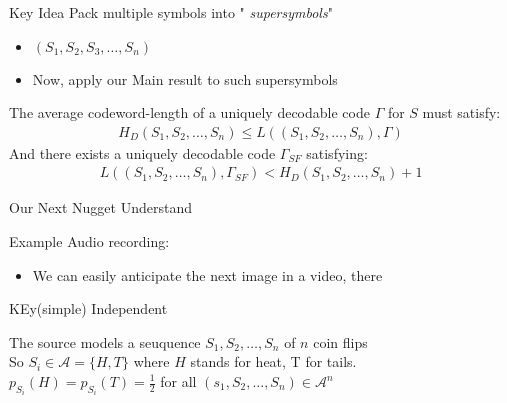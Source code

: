 

\begin{parag}{Key Idea}
    Pack multiple symbols into " \textit{supersymbols}"
    \begin{itemize}
        \item $(S_1, S_2, S_3, \dots, S_n)$
        \item Now, apply our Main result to such supersymbols
    \end{itemize}
    \begin{theoreme}
        The average codeword-length of a uniquely decodable code $ \Gamma$ for $S$ must satisfy:
        \begin{align*}
            H_D(S_1, S_2, \dots, S_n) \leq L((S_1, S_2, \dots, S_n), \Gamma)
        \end{align*}
        And there exists a uniquely decodable code $ \Gamma_{SF}$ satisfying:
        \begin{align*}
            L((S_1, S_2, \dots, S_n), \Gamma_{SF}) < H_D(S_1, S_2, \dots, S_n) + 1
        \end{align*}
    \end{theoreme}
\end{parag}

\begin{parag}{Our Next Nugget}
    Understand

    \begin{subparag}{Example}
        Audio recording:
        \begin{itemize}
            \item We can easily anticipate the next image in a video, there
        \end{itemize}
    \end{subparag}

\end{parag}

\begin{parag}{KEy(simple) Independent}
    \begin{definition}
        The source models a seuquence $S_1, S_2, \dots, S_n$ of $n$ coin flips
        \\
        So $S_i \in \mathcal{A} = \{H, T\}$ where $H$ stands for heat, T for tails.
        \\
        $p_{S_i}(H) = p_{S_i}(T) = \frac{1}{2}$ for all $(s_1, S_2, \dots, S_n) \in \mathcal{A}^n$
    \end{definition}

    

\end{parag}

